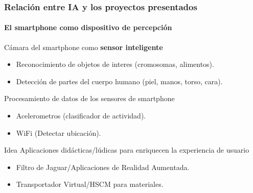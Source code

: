 \documentclass[aspectratio=169]{beamer}
\begin{document}
\begin{frame}
\frametitle{Relación entre IA y los proyectos presentados}
\framesubtitle{El smartphone como dispositivo de percepción}

\begin{block}{Cámara del smartphone como \textbf{sensor inteligente}}
\begin{itemize}
\item Reconocimiento de objetos de interes  (cromosomas, alimentos).
\item Detección de partes del cuerpo humano  (piel, manos, torso, cara).
\end{itemize}
\end{block}

\begin{block}{Procesamiento de datos de los sensores de smartphone}
\begin{itemize}
\item Acelerometros (clasificador de actividad).
\item WiFi (Detectar ubicación).
\end{itemize}
\end{block}


\begin{block}{Idea Aplicaciones didácticas/lúdicas para enriquecen la experiencia de usuario}
\begin{itemize}
\item Filtro de Jaguar/Aplicaciones de Realidad Aumentada.
\item Transportador Virtual/HSCM para materiales.
\end{itemize}

\end{block}


\end{frame}
\end{document}
